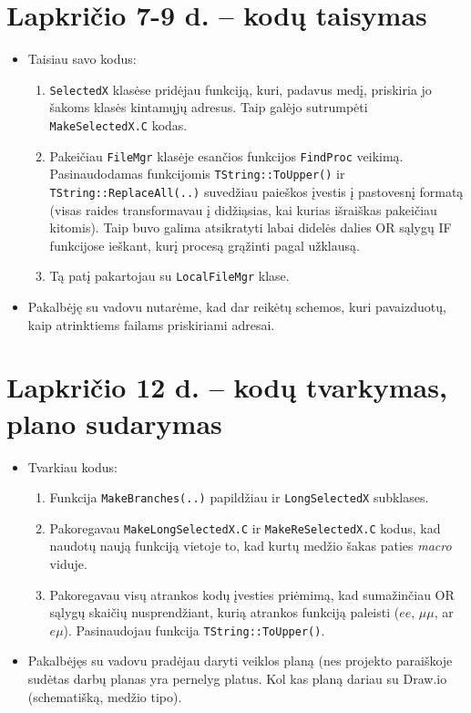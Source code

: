 \documentclass[a4paper, 12pt]{article}
\newcommand{\ttt}[1]{\texttt{#1}}
\begin{document}
\section{Lapkričio 7-9 d. -- kodų taisymas}
\begin{itemize}
	\item Taisiau savo kodus:
	\begin{enumerate}
		\item \ttt{SelectedX} klasėse pridėjau funkciją, kuri, padavus medį, priskiria jo šakoms
		klasės kintamųjų adresus. Taip galėjo sutrumpėti \ttt{MakeSelectedX.C} kodas.
		\item Pakeičiau \ttt{FileMgr} klasėje esančios funkcijos \ttt{FindProc} veikimą.
		Pasinaudodamas funkcijomis \ttt{TString::ToUpper()} ir \ttt{TString::ReplaceAll(..)}
		suvedžiau paieškos įvestis į pastovesnį formatą (visas raides transformavau į didžiąsias,
		kai kurias išraiškas pakeičiau kitomis). Taip buvo galima atsikratyti labai didelės
		dalies OR sąlygų IF funkcijose ieškant, kurį procesą grąžinti pagal užklausą.
		\item Tą patį pakartojau su \ttt{LocalFileMgr} klase.
	\end{enumerate}
	\item Pakalbėję su vadovu nutarėme, kad dar reikėtų schemos, kuri pavaizduotų, kaip
	atrinktiems failams priskiriami adresai.
\end{itemize}

\section{Lapkričio 12 d. -- kodų tvarkymas, plano sudarymas}
\begin{itemize}
	\item Tvarkiau kodus:
	\begin{enumerate}
		\item Funkcija \ttt{MakeBranches(..)} papildžiau ir \ttt{LongSelectedX} subklases.
		\item Pakoregavau \ttt{MakeLongSelectedX.C} ir \ttt{MakeReSelectedX.C} kodus, kad
		naudotų naują funkciją vietoje to, kad kurtų medžio šakas paties \textit{macro} viduje.
		\item Pakoregavau visų atrankos kodų įvesties priėmimą, kad sumažinčiau OR sąlygų
		skaičių nusprendžiant, kurią atrankos funkciją paleisti ($ee$, $\mu\mu$, ar $e\mu$).
		Pasinaudojau funkcija \ttt{TString::ToUpper()}.
	\end{enumerate}
	\item Pakalbėjęs su vadovu pradėjau daryti veiklos planą (nes projekto paraiškoje sudėtas
	darbų planas yra pernelyg platus. Kol kas planą dariau su Draw.io (schematišką, medžio tipo).
\end{itemize}
\end{document}
